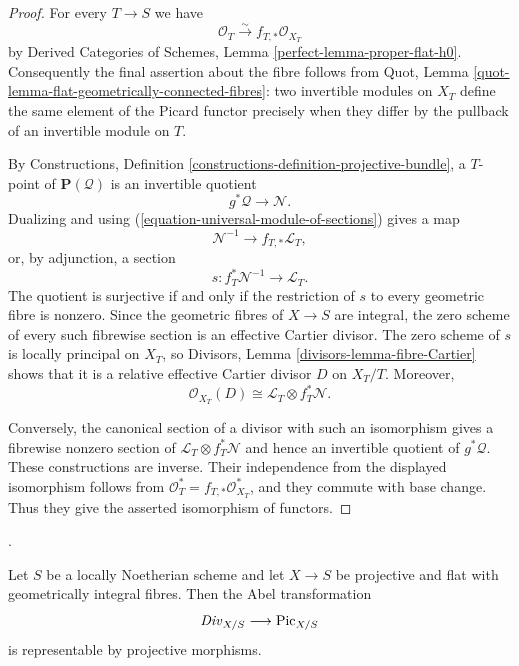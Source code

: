 \begin{proof}
For every $T \to S$ we have
$$
\mathcal{O}_T \xrightarrow{\sim} f_{T, *}\mathcal{O}_{X_T}
$$
by Derived Categories of Schemes, Lemma
\ref{perfect-lemma-proper-flat-h0}. Consequently the final assertion about
the fibre follows from Quot, Lemma
\ref{quot-lemma-flat-geometrically-connected-fibres}: two invertible modules
on $X_T$ define the same element of the Picard functor precisely when they
differ by the pullback of an invertible module on $T$.

By Constructions, Definition
\ref{constructions-definition-projective-bundle}, a $T$-point of
$\mathbf{P}(\mathcal{Q})$ is an invertible quotient
$$
g^*\mathcal{Q} \longrightarrow \mathcal{N}.
$$
Dualizing and using
(\ref{equation-universal-module-of-sections}) gives a map
$$
\mathcal{N}^{-1} \longrightarrow f_{T, *}\mathcal{L}_T,
$$
or, by adjunction, a section
$$
s : f_T^*\mathcal{N}^{-1} \longrightarrow \mathcal{L}_T.
$$
The quotient is surjective if and only if the restriction of $s$ to every
geometric fibre is nonzero. Since the geometric fibres of $X \to S$ are
integral, the zero scheme of every such fibrewise section is an effective
Cartier divisor. The zero scheme of $s$ is locally principal on $X_T$, so
Divisors, Lemma \ref{divisors-lemma-fibre-Cartier} shows that it is a relative
effective Cartier divisor $D$ on $X_T/T$. Moreover,
$$
\mathcal{O}_{X_T}(D) \cong
\mathcal{L}_T \otimes f_T^*\mathcal{N}.
$$

Conversely, the canonical section of a divisor with such an isomorphism
gives a fibrewise nonzero section of
$\mathcal{L}_T \otimes f_T^*\mathcal{N}$ and hence an invertible quotient of
$g^*\mathcal{Q}$. These constructions are inverse. Their independence from
the displayed isomorphism follows from
$\mathcal{O}_T^* = f_{T, *}\mathcal{O}_{X_T}^*$, and they commute with base
change. Thus they give the asserted isomorphism of functors.
\end{proof}

\begin{lemma}
\label{corollary-divisor-to-picard-projective}
\begin{reference}
\cite[Expos\'e 232, Corollary 4.4, p. 153]{FGA}.
\end{reference}
Let $S$ be a locally Noetherian scheme and let $X \to S$ be projective and
flat with geometrically integral fibres. Then the Abel transformation
$$
\mathit{Div}_{X/S} \longrightarrow \mathrm{Pic}_{X/S}
$$
is representable by projective morphisms.
\end{lemma}


